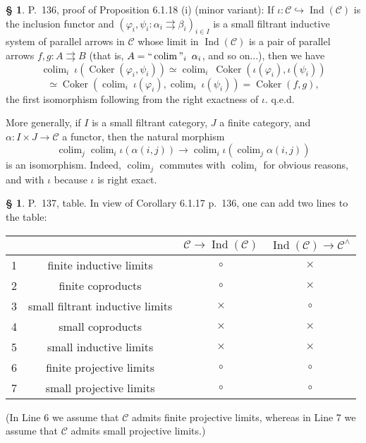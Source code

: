 \documentclass[12pt]{article}%
\theoremstyle{remark}
\theoremstyle{definition}
\newtheorem{s}[thm]{\S}%
\newcommand{\C}{\mathcal C}
\newcommand{\parar}{\rightrightarrows}
\DeclareMathOperator*{\colim}{colim}
\DeclareMathOperator*{\ic}{``\colim"}
\DeclareMathOperator{\Coker}{Coker}
\DeclareMathOperator{\Ind}{Ind}
\begin{document}
\begin{s} 
P.~136, proof of Proposition 6.1.18 (i) (minor variant): If $\iota:\C\hookrightarrow\Ind(\C)$ is the inclusion functor and $(\varphi_i,\psi_i:\alpha_i\parar\beta_i)_{i\in I}$ is a small filtrant inductive system of parallel arrows in $\C$ whose limit in $\Ind(\C)$ is a pair of parallel arrows $f,g:A\parar B$ (that is, $A=\ic_i\ \alpha_i$, and so on...), then we have 
$$
\colim_i\ \iota(\Coker(\varphi_i,\psi_i))\simeq
\colim_i\ \Coker(\iota(\varphi_i),\iota(\psi_i))
$$
$$
\simeq
\Coker(\colim_i\ \iota(\varphi_i),\colim_i\ \iota(\psi_i))=
\Coker(f,g),
$$ 
the first isomorphism following from the right exactness of $\iota$. q.e.d.

More generally, if $I$ is a small filtrant category, $J$ a finite category, and $\alpha:I\times J\to\C$ a functor, then the natural morphism 
$$
\colim_j\colim_i\iota(\alpha(i,j))\to\colim_i\iota\left(\colim_j\alpha(i,j)\right) 
$$ 
is an isomorphism. Indeed, $\colim_j$ commutes with $\colim_i$ for obvious reasons, and with $\iota$ because $\iota$ is right exact.
\end{s}

%

\begin{s} 
P.~137, table. In view of Corollary 6.1.17 p.~136, one can add two lines to the table:\bigskip 

\begin{center}
\begin{tabular}{|c|c|c|c|}\hline
&&$\C\to\Ind(\C)$&$\Ind(\C)\to\C^\wedge$\\ \hline
1&finite inductive limits&$\circ$&$\times$\\ \hline
2&finite coproducts&$\circ$&$\times$\\ \hline
3&small filtrant inductive limits&$\times$&$\circ$\\ \hline
4&small coproducts&$\times$&$\times$\\ \hline
5&small inductive limits&$\times$&$\times$\\ \hline
6&finite projective limits&$\circ$&$\circ$\\ \hline
7&small projective limits&$\circ$&$\circ$\\ \hline
\end{tabular}
\end{center}%
\noindent(In Line 6 we assume that $\C$ admits finite projective limits, whereas in Line 7 we assume that $\C$ admits small projective limits.)%
\end{s}
\end{document}
